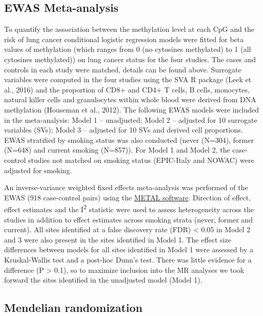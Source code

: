 \documentclass[11pt,twoside]{bristolthesis}
\begin{document}
\hypertarget{ewas-meta-analysis}{%
\subsection{EWAS Meta-analysis}\label{ewas-meta-analysis}}

To quantify the association between the methylation level at each CpG and the risk of lung cancer conditional logistic regression models were fitted for beta values of methylation (which ranges from 0 (no cytosines methylated) to 1 (all cytosines methylated)) on lung cancer status for the four studies. The cases and controls in each study were matched, details can be found above. Surrogate variables were computed in the four studies using the SVA R package (Leek et al., 2016) and the proportion of CD8+ and CD4+ T cells, B cells, monocytes, natural killer cells and granulocytes within whole blood were derived from DNA methylation (Houseman et al., 2012). The following EWAS models were included in the meta-analysis: Model 1 -- unadjusted; Model 2 -- adjusted for 10 surrogate variables (SVs); Model 3 -- adjusted for 10 SVs and derived cell proportions. EWAS stratified by smoking status was also conducted (never (N=304), former (N=648) and current smoking (N=857)). For Model 1 and Model 2, the case-control studies not matched on smoking status (EPIC-Italy and NOWAC) were adjusted for smoking.

An inverse-variance weighted fixed effects meta-analysis was performed of the EWAS (918 case-control pairs) using the \href{http://csg.sph.umich.edu/abecasis/metal/}{METAL software}. Direction of effect, effect estimates and the I\textsuperscript{2} statistic were used to assess heterogeneity across the studies in addition to effect estimates across smoking strata (never, former and current). All sites identified at a false discovery rate (FDR) \textless{} 0.05 in Model 2 and 3 were also present in the sites identified in Model 1. The effect size differences between models for all sites identified in Model 1 were assessed by a Kruskal-Wallis test and a post-hoc Dunn's test. There was little evidence for a difference (P \textgreater{} 0.1), so to maximize inclusion into the MR analyses we took forward the sites identified in the unadjusted model (Model 1).

\hypertarget{mendelian-randomization-1}{%
\subsection{Mendelian randomization}\label{mendelian-randomization-1}}
\end{document}
